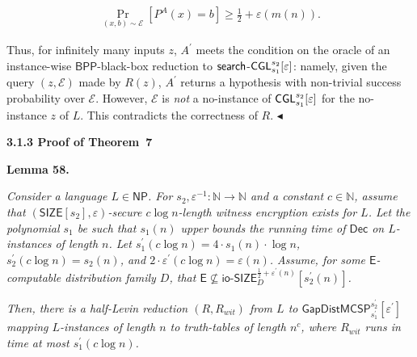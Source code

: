 \documentclass[10pt,a4paper]{article}
\begin{document}
\[\begin{gathered}
\Pr_{(x,b)\sim\mathcal{E}}[P^{A}(x)=b]\geq\frac{1}{2}+\varepsilon(m(n)).
\end{gathered}\]


Thus, for infinitely many inputs $z$, $A^{\prime}$ meets the condition on the oracle of an instance-wise ${\mathsf{BPP}}$-black-box reduction to ${\sf search}$-${\sf CGL}^{s_{2}}_{s_{1}}[\varepsilon]$: namely, given the query $(z,\mathcal{E})$ made by $R(z)$, $A^{\prime}$ returns a hypothesis with non-trivial success probability over $\mathcal{E}$. However, $\mathcal{E}$ is \emph{not} a no-instance of ${\sf CGL}_{s_{1}}^{s_{2}}[\varepsilon]$ for the no-instance $z$ of $L$. This contradicts the correctness of $R$.
$\blacktriangleleft$\par






\par\medskip\noindent\textbf{
3.1.3 Proof of Theorem 7
}\par





\par\medskip\noindent\textbf{
\textbf{Lemma 58}\textbf{.}
}\par



\emph{Consider a language $L\in{\mathsf{NP}}$. For $s_{2},\varepsilon^{-1}:\mathbb{N}\to\mathbb{N}$ and a constant $c\in\mathbb{N}$, assume that $({\mathsf{SIZE}}[s_{2}],\varepsilon)$-secure $c\log n$-length witness encryption exists for $L$. Let the polynomial $s_{1}$ be such that $s_{1}(n)$ upper bounds the running time of ${\mathsf{Dec}}$ on $L$-instances of length $n$. Let $s_{1}^{\prime}(c\log n)=4\cdot s_{1}(n)\cdot\log n$, $s_{2}^{\prime}(c\log n)=s_{2}(n)$, and $2\cdot\varepsilon^{\prime}(c\log n)=\varepsilon(n)$. Assume, for some ${\mathsf{E}}$-computable distribution family $D$, that ${\mathsf{E}}\nsubseteq{\mathsf{io\text{-}}}{\mathsf{SIZE}}_{D}^{\frac{1}{2}+\varepsilon^{\prime}(n)}[s_{2}^{\prime}(n)]$.}\par




\emph{Then, there is a half-Levin reduction $(R,R_{wit})$ from $L$ to ${\mathsf{GapDistMCSP}}_{s_{1}^{\prime}}^{s_{2}^{\prime}}[\varepsilon^{\prime}]$ mapping $L$-instances of length $n$ to truth-tables of length $n^{c}$, where $R_{wit}$ runs in time at most $s_{1}^{\prime}(c\log n)$.}\par
\end{document}
